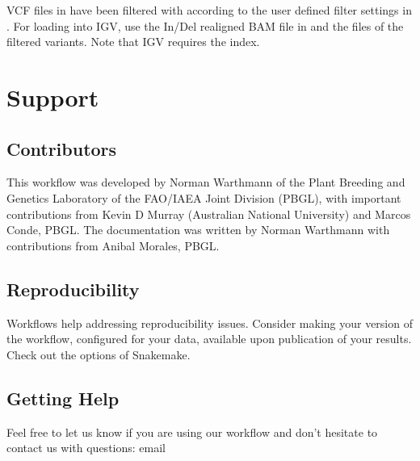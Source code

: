 \documentclass[letterpaper,10pt,english]{sphinxhowto}
\begin{document}
VCF files in  have been filtered with  according to the user defined filter settings in .
For loading into IGV, use the In/Del realigned BAM file in  and the  files of the filtered variants. Note that IGV requires the  index.


\section{Support}
\label{\detokenize{index:support}}

\subsection{Contributors}
\label{\detokenize{index:contributors}}
This workflow was developed by Norman Warthmann of the Plant Breeding and Genetics Laboratory of the FAO/IAEA Joint Division (PBGL), with important contributions from Kevin D Murray (Australian National University) and Marcos Conde, PBGL. The documentation was written by Norman Warthmann with contributions from Anibal Morales, PBGL.


\subsection{Reproducibility}
\label{\detokenize{index:reproducibility}}
Workflows help addressing reproducibility issues. Consider making your version of the workflow, configured for your data, available upon publication of your results. Check out the  options of Snakemake.


\subsection{Getting Help}
\label{\detokenize{index:getting-help}}
Feel free to let us know if you are using our workflow and don’t hesitate to contact us with questions: email 



\renewcommand{\indexname}{Index}
\printindex
\end{document}
